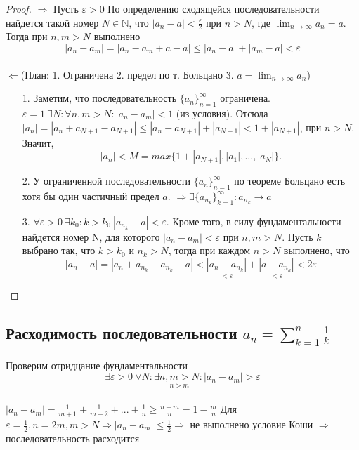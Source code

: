 \documentclass[12pt]{article}
\begin{document}
\begin{proof}
$\Longrightarrow$ Пусть $\varepsilon > 0$ По определению сходящейся последовательности найдется такой номер $N \in \mathds{N}$, что $|a_n - a| < \frac{\varepsilon}{2}$ при $n > N$, где $ \lim_{n\to\infty} a_n = a$. Тогда при $n, m > N$ выполнено $$|a_n - a_m| = |a_n - a_m + a - a| \leqslant |a_n - a| + |a_m - a| < \varepsilon$$ \\ $\Longleftarrow$(План: 1. Ограничена 2. предел по т. Больцано 3. $a = \lim_{n\to\infty}a_n$) \begin{itemize}
    \item[1.] Заметим, что последовательность $\{a_n\}_{n=1}^\infty$ ограничена. $\varepsilon = 1 \ \exists N: \forall n, m > N: |a_n - a_m| < 1$ (из условия). Отсюда $|a_n| = |a_n + a_{N+1} - a_{N+1}| \leqslant |a_n - a_{N+1}| + |a_{N+1}| < 1 + |a_{N+1}|$, при $n>N$. Значит, $$|a_n| < M = max\{1+|a_{N+1}|, |a_1|, ..., |a_N|\}.$$
    \item[2.]У ограниченной последовательности $\{a_n\}_{n=1}^\infty$ по теореме Больцано есть хотя бы один частичный предел $a$. $\Rightarrow \exists \{a_{n_{k}}\}_{k=1}^\infty: a_{n_{k}} \rightarrow a$
    \item[3.] $\forall \varepsilon > 0\ \exists k_0: k > k_0\ |a_{n_{k}} - a| < \varepsilon.$ Кроме того, в силу фундаментальности найдется номер N, для которого $|a_n - a_m| < \varepsilon$ при $n, m > N$. Пусть $k$ выбрано так, что $k > k_0$ и $n_k > N$, тогда при каждом $n > N$ выполнено, что $$|a_n - a| = |a_n + a_{n_{k}} - a_{n_{k}} - a| < \underset{<\varepsilon}{|a_n - a_{n_k}|} + \underset{<\varepsilon}{|a- a_{n_k}|} < 2\varepsilon$$
\end{itemize}
\end{proof}
\subsection{Расходимость последовательности $a_n = \sum^n_{k=1}\frac{1}{k}$} Проверим отридцание фундаментальности $$\exists \varepsilon > 0 \ \forall N: \exists \underset{n > m}{n,m > N}:|a_n - a_m| > \varepsilon$$ \\ $|a_n - a_m| = \frac{1}{m+1} + \frac{1}{m+2}+...+\frac{1}{n} 
\geqslant \frac{n-m}{n}= 1 - \frac{m}{n}$ Для $\varepsilon = \frac{1}{2}, n = 2m, m > N \Longrightarrow |a_n - a_m| \leqslant \frac{1}{2} \Longrightarrow$ не выполнено условие Коши $\Longrightarrow$ последовательность расходится
\end{document}

